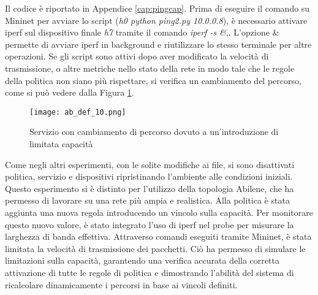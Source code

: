 Il codice è riportato in Appendice \ref{cap:pingcap}.
\newline Prima di eseguire il comando su Mininet per avviare lo script (\textit{h0 python ping2.py 10.0.0.8}), è necessario attivare iperf sul dispositivo finale \textit{h7} tramite il comando \textit{iperf -s \&},.
L'opzione \& permette di avviare iperf in background e riutilizzare lo stesso terminale per altre operazioni.
Se gli script sono attivi dopo aver modificato la velocità di trasmissione, o altre metriche nello stato della rete
in modo tale che le regole della politica non siano più rispettare, si verifica un cambiamento del percorso,
come si può vedere dalla Figura \ref{fig:abilene post}.
\begin{figure}[h]
    \centering
   \texttt{[image: ab\_def\_10.png]}
    \caption{Servizio con cambiamento di percorso dovuto a un'introduzione di limitata capacità}
    \label{fig:abilene post}
\end{figure}
Come negli altri esperimenti, con le solite modifiche ai file, si sono disattivati politica, servizio e dispositivi ripristinando l'ambiente alle condizioni iniziali.
\newline Questo esperimento si è distinto per l'utilizzo della topologia Abilene, che ha permesso di lavorare su una rete più ampia e realistica.
Alla politica è stata aggiunta una nuova regola introducendo un vincolo sulla capacità.
Per monitorare questo nuovo valore, è stato integrato l'uso di iperf nel probe per misurare la larghezza di banda effettiva.
Attraverso comandi eseguiti tramite Mininet, è stata limitata la velocità di trasmissione dei pacchetti. 
Ciò ha permesso di simulare le limitazioni sulla capacità, garantendo una verifica accurata della corretta attivazione di tutte le regole di politica e 
dimostrando l'abilità del sistema di ricalcolare dinamicamente i percorsi in base ai vincoli definiti.
